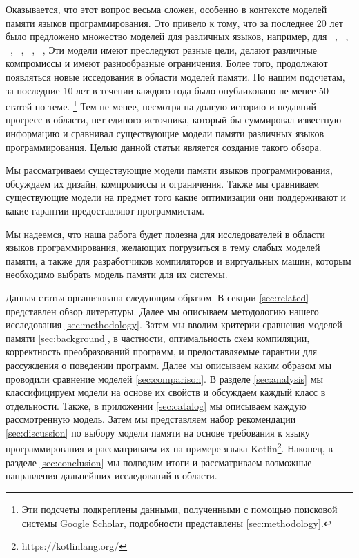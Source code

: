 Оказывается, что этот вопрос весьма сложен, 
особенно в контексте моделей памяти языков программирования.
Это привело к тому, что за последнее 20 лет было предложено 
множество моделей для различных языков, например, для 
\Java~\cite{Manson-al:POPL05, Bender-Palsberg:OOPSLA19}, \CPP~\cite{Batty-al:POPL11}, 
\LLVM~\cite{Chakraborty-Vafeiadis:CGO17}, \JS~\cite{Watt-al:PLDI2020}, 
\OCaml~\cite{Manson-al:POPL05}, \Haskell~\cite{Vollmer-al:PPoPP17}, \etc
Эти модели имеют преследуют разные цели, делают различные компромиссы
и имеют разнообразные ограничения.
Более того, продолжают появляться новые исседования в области моделей памяти. 
По нашим подсчетам, за последние 10 лет в течении 
каждого года было опубликовано не менее 50 статей по теме.
\footnote{Эти подсчеты подкреплены данными, полученными 
с помощью поисковой системы Google Scholar, 
подробности представлены \cref{sec:methodology}.}
Тем не менее, несмотря на долгую историю и недавний прогресс в области,
нет единого источника, который бы суммировал 
известную информацию и сравнивал существующие 
модели памяти различных языков программирования. 
Целью данной статьи является создание такого обзора. 

Мы рассматриваем существующие модели памяти языков программирования, 
обсуждаем их дизайн, компромиссы и ограничения. 
Также мы сравниваем существующие модели на предмет того
какие оптимизации они поддерживают 
и какие гарантии предоставляют программистам. 

Мы надеемся, что наша работа будет полезна для 
исследователей в области языков программирования, 
желающих погрузиться в тему слабых моделей памяти, 
а также для разработчиков компиляторов и виртуальных машин, 
которым необходимо выбрать модель памяти для их системы.

Данная статья организована следующим образом. 
В секции \cref{sec:related} представлен обзор литературы. 
Далее мы описываем методологию нашего исследования \cref{sec:methodology}.
Затем мы вводим критерии сравнения моделей памяти \cref{sec:background}, 
в частности, оптимальность схем компиляции, 
корректность преобразований программ,
и предоставляемые гарантии для рассуждения 
о поведении программ.  
Далее мы описываем каким образом мы проводили 
сравнение моделей \cref{sec:comparison}. 
В разделе \cref{sec:analysis} мы классифицируем модели на основе их свойств
и обсуждаем каждый класс в отдельности. 
Также, в приложении \ref{sec:catalog} мы описываем каждую рассмотренную модель. 
Затем мы представляем набор рекомендации \cref{sec:discussion}
по выбору модели памяти на основе требования к языку программирования 
и рассматриваем их на примере языка Kotlin\footnote{https://kotlinlang.org/}.
Наконец, в разделе \cref{sec:conclusion} мы подводим итоги 
и рассматриваем возможные направления дальнейших исследований в области.
